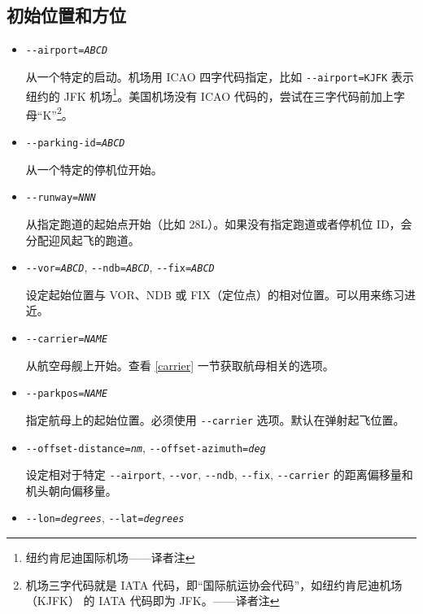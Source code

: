 \ifchinese
{
  \subsection{初始位置和方位\label{aiportid}}
\begin{itemize}
\item{\texttt{-$ $-airport={\it ABCD}}}

 从一个特定的启动。机场用 ICAO 四字代码指定，比如 \texttt{-$ $-airport=KJFK} 表示纽约的 JFK 机场\footnote{纽约肯尼迪国际机场——译者注}。美国机场没有 ICAO 代码的，尝试在三字代码前加上字母“K”\footnote{机场三字代码就是 IATA 代码，即“国际航运协会代码”，如纽约肯尼迪机场（KJFK） 的 IATA 代码即为 JFK。——译者注}。

\item{\texttt{-$ $-parking-id={\it ABCD}}}

从一个特定的停机位开始。

\item{\texttt{-$ $-runway={\it NNN}}}

从指定跑道的起始点开始（比如 28L）。如果没有指定跑道或者停机位 ID，会分配迎风起飞的跑道。

 \item{\texttt{-$ $-vor={\it ABCD}}, \texttt{-$ $-ndb={\it ABCD}}, \texttt{-$ $-fix={\it ABCD}}}

设定起始位置与 VOR、NDB 或 FIX（定位点）的相对位置。可以用来练习进近。

\item{\texttt{-$ $-carrier={\it NAME}}}

从航空母舰上开始。查看 \ref{carrier} 一节获取航母相关的选项。

\item{\texttt{-$ $-parkpos={\it NAME}}}

指定航母上的起始位置。必须使用 \texttt{-$ $-carrier} 选项。默认在弹射起飞位置。

\item{\texttt{-$ $-offset-distance={\it nm}}, \texttt{-$ $-offset-azimuth={\it deg}}}

设定相对于特定 \texttt{-$ $-airport}, \texttt{-$ $-vor}, \texttt{-$ $-ndb}, \texttt{-$ $-fix}, \texttt{-$ $-carrier} 的距离偏移量和机头朝向偏移量。

 \item{\texttt{-$ $-lon={\it degrees}}, \texttt{-$ $-lat={\it degrees}}}


\end{itemize}}
